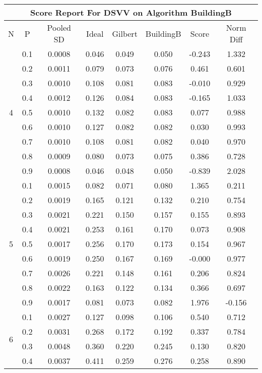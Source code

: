 \documentclass[11pt,a4paper]{report}
\begin{document}
\begin{longtable}{ | c | c || c | c | c | c | c | c | }
\hline
\multicolumn{8}{|c|}{ Score Report For DSVV on Algorithm BuildingB} \\
\hline
N & P & Pooled SD &  Ideal &  Gilbert & BuildingB  & Score & Norm Diff \\
 \hline
 \hline
 \endhead
\multirow{9}{*}{4} & 0.1 & 0.0008 & 0.046 & 0.049 & 0.050 & -0.243 & 1.332 \\
 & 0.2 & 0.0011 & 0.079 & 0.073 & 0.076 & 0.461 & 0.601 \\
 & 0.3 & 0.0010 & 0.108 & 0.081 & 0.083 & -0.010 & 0.929 \\
 & 0.4 & 0.0012 & 0.126 & 0.084 & 0.083 & -0.165 & 1.033 \\
 & 0.5 & 0.0010 & 0.132 & 0.082 & 0.083 & 0.077 & 0.988 \\
 & 0.6 & 0.0010 & 0.127 & 0.082 & 0.082 & 0.030 & 0.993 \\
 & 0.7 & 0.0010 & 0.108 & 0.081 & 0.082 & 0.040 & 0.970 \\
 & 0.8 & 0.0009 & 0.080 & 0.073 & 0.075 & 0.386 & 0.728 \\
 & 0.9 & 0.0008 & 0.046 & 0.048 & 0.050 & -0.839 & 2.028 \\
 \hline
\multirow{9}{*}{5} & 0.1 & 0.0015 & 0.082 & 0.071 & 0.080 & 1.365 & 0.211 \\
 & 0.2 & 0.0019 & 0.165 & 0.121 & 0.132 & 0.210 & 0.754 \\
 & 0.3 & 0.0021 & 0.221 & 0.150 & 0.157 & 0.155 & 0.893 \\
 & 0.4 & 0.0021 & 0.253 & 0.161 & 0.170 & 0.073 & 0.908 \\
 & 0.5 & 0.0017 & 0.256 & 0.170 & 0.173 & 0.154 & 0.967 \\
 & 0.6 & 0.0019 & 0.250 & 0.167 & 0.169 & -0.000 & 0.977 \\
 & 0.7 & 0.0026 & 0.221 & 0.148 & 0.161 & 0.206 & 0.824 \\
 & 0.8 & 0.0022 & 0.163 & 0.122 & 0.134 & 0.366 & 0.697 \\
 & 0.9 & 0.0017 & 0.081 & 0.073 & 0.082 & 1.976 & -0.156 \\
 \hline
\multirow{9}{*}{6} & 0.1 & 0.0027 & 0.127 & 0.098 & 0.106 & 0.540 & 0.712 \\
 & 0.2 & 0.0031 & 0.268 & 0.172 & 0.192 & 0.337 & 0.784 \\
 & 0.3 & 0.0048 & 0.360 & 0.220 & 0.245 & 0.130 & 0.820 \\
 & 0.4 & 0.0037 & 0.411 & 0.259 & 0.276 & 0.258 & 0.890 \\

\end{longtable}
\end{document}
